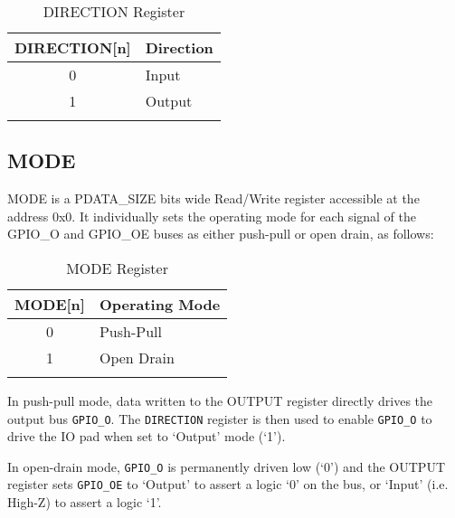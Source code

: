 \begin{longtable}[]{@{}cl@{}}
\toprule
\textbf{DIRECTION[n]} & \textbf{Direction}\tabularnewline
\midrule
\endhead
0 & Input\tabularnewline
1 & Output\tabularnewline
\bottomrule
\caption{DIRECTION Register}
\end{longtable}

\subsection{MODE}\label{mode}

MODE is a PDATA\_SIZE bits wide Read/Write register accessible at the
address 0x0. It individually sets the operating mode for each signal of
the GPIO\_O and GPIO\_OE buses as either push-pull or open drain, as
follows:

\begin{longtable}[]{@{}cl@{}}
\toprule
\textbf{MODE[n]} & \textbf{Operating Mode}\tabularnewline
\midrule
\endhead
0 & Push-Pull\tabularnewline
1 & Open Drain\tabularnewline
\bottomrule
\caption{MODE Register}
\end{longtable}

In push-pull mode, data written to the OUTPUT register directly drives
the output bus \texttt{GPIO\_O}. The \texttt{DIRECTION} register is then used to enable
\texttt{GPIO\_O} to drive the IO pad when set to `Output' mode (`1').

In open-drain mode, \texttt{GPIO\_O} is permanently driven low (`0') and the
OUTPUT register sets \texttt{GPIO\_OE} to `Output' to assert a logic `0' on the
bus, or `Input' (i.e. High-Z) to assert a logic `1'.

